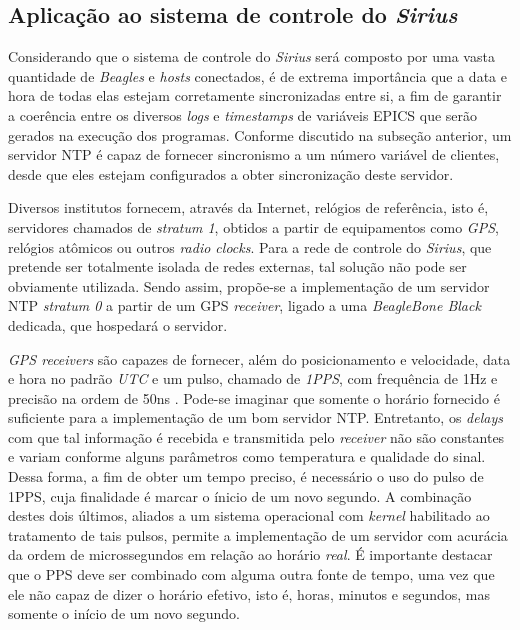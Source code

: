 \FloatBarrier
\subsection {Aplicação ao sistema de controle do \textit{Sirius}}

Considerando que o sistema de controle do \textit{Sirius} será composto por uma
vasta quantidade de \textit{Beagles} e \textit{hosts} conectados, é de extrema
importância que a data e hora de todas elas estejam corretamente sincronizadas
entre si, a fim de garantir a coerência entre os diversos \textit{logs} e
\textit{timestamps} de variáveis EPICS que serão gerados na execução dos
programas. Conforme discutido na subseção anterior, um servidor NTP é capaz de
fornecer sincronismo a um número variável de clientes, desde que eles estejam
configurados a obter sincronização deste servidor.

\vspace{12pt}  

Diversos institutos fornecem, através da Internet, relógios de referência, isto
é, servidores chamados de \textit{stratum 1}, obtidos a partir de equipamentos
como \textit{GPS}, relógios atômicos ou outros \textit{radio clocks}. Para a rede
de controle do \textit{Sirius}, que pretende ser totalmente isolada de redes
externas, tal solução não pode ser obviamente utilizada. Sendo assim, propõe-se
a implementação de um servidor NTP \textit{stratum 0} a partir de um GPS
\textit{receiver}, ligado a uma \textit{BeagleBone Black} dedicada, que
hospedará o servidor.

\vspace{12pt}

\textit{GPS receivers} são capazes de fornecer, além do posicionamento e
velocidade, data e hora no padrão \textit{UTC} e um pulso, chamado de
\textit{1PPS}, com frequência de 1Hz e precisão na ordem de 50ns
\cite{gpsdhowto}. Pode-se imaginar que somente o horário fornecido é suficiente
para a implementação de um bom servidor NTP. Entretanto, os \textit{delays} com
que tal informação é recebida e transmitida pelo \textit{receiver} não são
constantes e variam conforme alguns parâmetros como temperatura e qualidade do
sinal. Dessa forma, a fim de obter um tempo preciso, é necessário o uso do pulso
de 1PPS, cuja finalidade é marcar o ínicio de um novo segundo. A combinação
destes dois últimos, aliados a um sistema operacional com \textit{kernel}
habilitado ao tratamento de tais pulsos, permite a implementação de um servidor
com acurácia da ordem de microssegundos em relação ao horário \textit{real}. É
importante destacar que o PPS deve ser combinado com alguma outra fonte de
tempo, uma vez que ele não capaz de dizer o horário efetivo, isto é, horas,
minutos e segundos, mas somente o início de um novo segundo.

